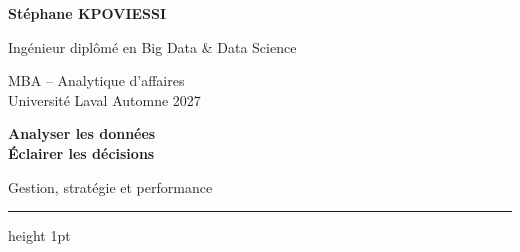 \documentclass[10pt,a4paper]{article}
\begin{document}
\fontsize{10pt}{12.6pt}\selectfont
\begin{minipage}[t]{0.55\textwidth}
{\fontsize{22pt}{25pt}\selectfont\bfseries\color{accent}Stéphane KPOVIESSI}\par
Ingénieur diplômé en Big Data \& Data Science\par
{\color{muted}MBA -- Analytique d'affaires\\Université Laval \textbullet{} Automne 2027}
\end{minipage}\hfill
\begin{minipage}[t]{0.40\textwidth}
\raggedleft
{\bfseries\color{accent}Analyser les données\\Éclairer les décisions}\par
\vspace{4pt}
{\color{muted}Gestion, stratégie et performance}
\end{minipage}
\vspace{7pt}
{\color{rule}\hrule height 1pt}
\vspace{8pt}
\end{document}
